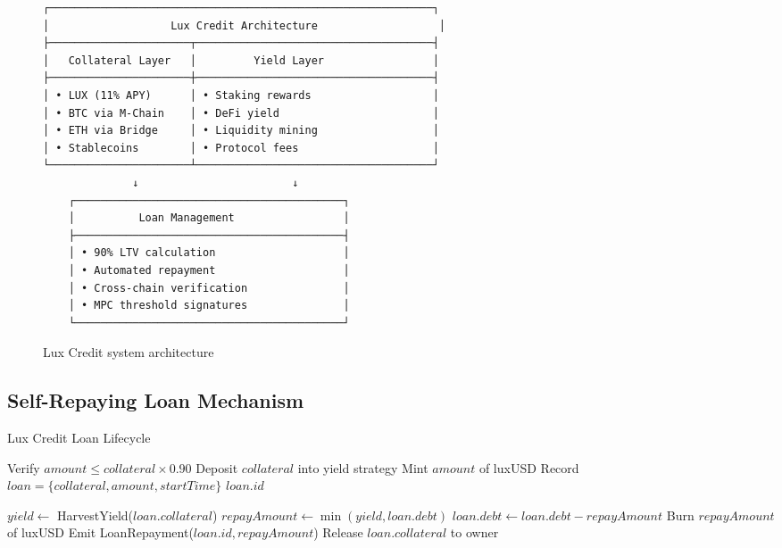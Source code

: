\documentclass[11pt,a4paper]{article}
\begin{document}
\begin{figure}[h]
\centering
\begin{verbatim}
┌────────────────────────────────────────────────────────────┐
│                   Lux Credit Architecture                   │
├──────────────────────┬─────────────────────────────────────┤
│   Collateral Layer   │         Yield Layer                 │
├──────────────────────┼─────────────────────────────────────┤
│ • LUX (11% APY)      │ • Staking rewards                   │
│ • BTC via M-Chain    │ • DeFi yield                        │
│ • ETH via Bridge     │ • Liquidity mining                  │
│ • Stablecoins        │ • Protocol fees                     │
└──────────────────────┴─────────────────────────────────────┘
              ↓                        ↓
    ┌──────────────────────────────────────────┐
    │          Loan Management                 │
    ├──────────────────────────────────────────┤
    │ • 90% LTV calculation                    │
    │ • Automated repayment                    │
    │ • Cross-chain verification               │
    │ • MPC threshold signatures               │
    └──────────────────────────────────────────┘
\end{verbatim}
\caption{Lux Credit system architecture}
\end{figure}

\subsection{Self-Repaying Loan Mechanism}

\begin{algorithm}[H]
\caption{Lux Credit Loan Lifecycle}
\begin{algorithmic}[1]
    \State Verify $amount \leq collateral \times 0.90$ 
    \State Deposit $collateral$ into yield strategy
    \State Mint $amount$ of luxUSD
    \State Record $loan = \{collateral, amount, startTime\}$
    \State \Return $loan.id$
\EndFunction

        \State $yield \gets$ HarvestYield($loan.collateral$)
        \State $repayAmount \gets \min(yield, loan.debt)$
        \State $loan.debt \gets loan.debt - repayAmount$
        \State Burn $repayAmount$ of luxUSD
        \State Emit LoanRepayment($loan.id, repayAmount$)
    \EndWhile
    \State Release $loan.collateral$ to owner
\EndFunction
\end{algorithmic}
\end{algorithm}
\end{document}
